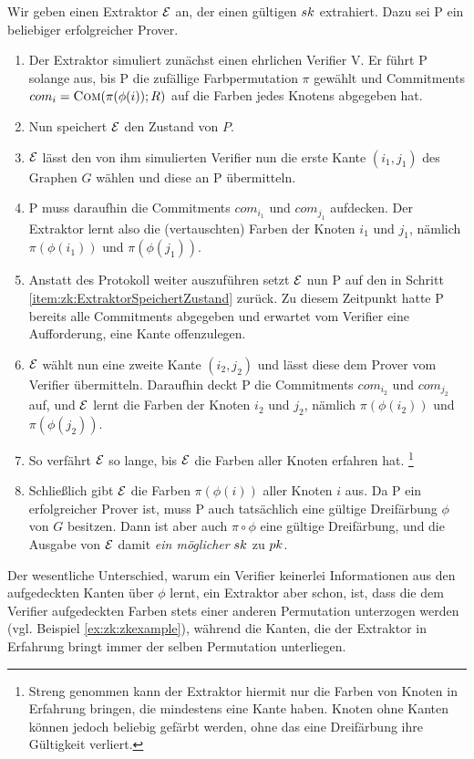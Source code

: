 \begin{beweis}
	Wir geben einen Extraktor $\mathcal{E}$ an, der einen gültigen $sk$ extrahiert. Dazu sei P ein beliebiger erfolgreicher Prover.
	
	\begin{enumerate}
		\item Der Extraktor simuliert zunächst einen ehrlichen Verifier V. Er führt P solange aus, bis P die zufällige Farbpermutation $\pi$ gewählt und Commitments $com_i = \textsc{Com}(\pi(\phi(i));R)$ auf die Farben jedes Knotens abgegeben hat.	
		\item \label{item:zk:ExtraktorSpeichertZustand}
		Nun speichert $\mathcal{E}$ den Zustand von $P$.
		\item $\mathcal{E}$ lässt den von ihm simulierten Verifier nun die erste Kante $(i_1, j_1)$ des Graphen $G$ wählen und diese an P übermitteln.
		\item P muss daraufhin die Commitments $com_{i_1}$ und $com_{j_1}$ aufdecken. Der Extraktor lernt also die (vertauschten) Farben der Knoten $i_1$ und $j_1$, nämlich $\pi(\phi(i_1))$ und $\pi(\phi(j_1))$.
		\item Anstatt des Protokoll weiter auszuführen setzt $\mathcal{E}$ nun P auf den in Schritt \ref{item:zk:ExtraktorSpeichertZustand} zurück. Zu diesem Zeitpunkt hatte P bereits alle Commitments abgegeben und erwartet vom Verifier eine Aufforderung, eine Kante offenzulegen.
		\item $\mathcal{E}$ wählt nun eine zweite Kante $(i_2, j_2)$ und lässt diese dem Prover vom Verifier übermitteln. Daraufhin deckt P die Commitments $com_{i_2}$ und $com_{j_2}$ auf, und $\mathcal{E}$ lernt die Farben der Knoten $i_2$ und $j_2$, nämlich $\pi(\phi(i_2))$ und $\pi(\phi(j_2))$.
		\item So verfährt $\mathcal{E}$ so lange, bis $\mathcal{E}$ die Farben aller Knoten erfahren hat.
		\footnote{Streng genommen kann der Extraktor hiermit nur die Farben von Knoten in Erfahrung bringen, die mindestens eine Kante haben. Knoten ohne Kanten können jedoch beliebig gefärbt werden, ohne das eine Dreifärbung ihre Gültigkeit verliert.}
		\item Schließlich gibt $\mathcal{E}$ die Farben $\pi(\phi(i))$ aller Knoten $i$ aus. Da P ein erfolgreicher Prover ist, muss P auch tatsächlich eine gültige Dreifärbung $\phi$ von $G$ besitzen. Dann ist aber auch $\pi \circ \phi$ eine gültige Dreifärbung, und die Ausgabe von $\mathcal{E}$ damit \emph{ein möglicher} $sk$ zu $pk$.
	\end{enumerate}
\end{beweis}

Der wesentliche Unterschied, warum ein Verifier keinerlei Informationen aus den aufgedeckten Kanten über $\phi$ lernt, ein Extraktor aber schon, ist, dass die dem Verifier aufgedeckten Farben stets einer anderen Permutation unterzogen werden (vgl. Beispiel \ref{ex:zk:zkexample}), während die Kanten, die der Extraktor in Erfahrung bringt immer der selben Permutation unterliegen.
